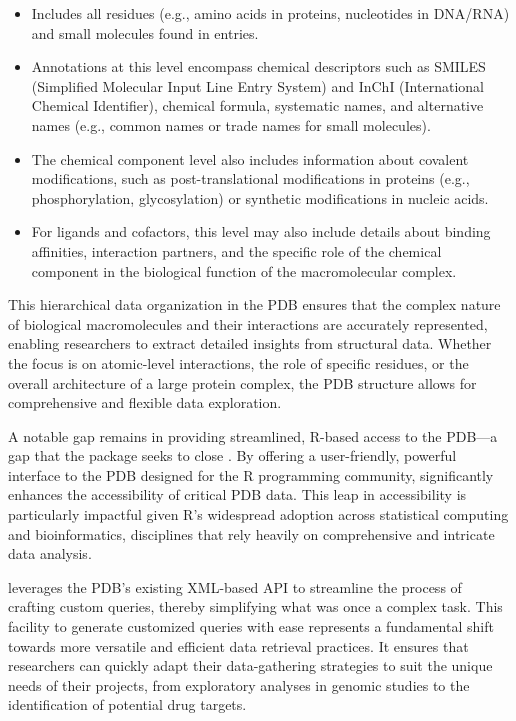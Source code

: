 \begin{itemize}
\tightlist
\item
  Includes all residues (e.g., amino acids in proteins, nucleotides in DNA/RNA) and small molecules found in entries.
\item
  Annotations at this level encompass chemical descriptors such as SMILES (Simplified Molecular Input Line Entry System) and InChI (International Chemical Identifier), chemical formula, systematic names, and alternative names (e.g., common names or trade names for small molecules).
\item
  The chemical component level also includes information about covalent modifications, such as post-translational modifications in proteins (e.g., phosphorylation, glycosylation) or synthetic modifications in nucleic acids.
\item
  For ligands and cofactors, this level may also include details about binding affinities, interaction partners, and the specific role of the chemical component in the biological function of the macromolecular complex.
\end{itemize}

This hierarchical data organization in the PDB ensures that the complex nature of biological macromolecules and their interactions are accurately represented, enabling researchers to extract detailed insights from structural data. Whether the focus is on atomic-level interactions, the role of specific residues, or the overall architecture of a large protein complex, the PDB structure allows for comprehensive and flexible data exploration.

A notable gap remains in providing streamlined, R-based access to the PDB---a gap that the  package seeks to close \citep{KorkmazYamasan2024}. By offering a user-friendly, powerful interface to the PDB designed for the R programming community,  significantly enhances the accessibility of critical PDB data. This leap in accessibility is particularly impactful given R's widespread adoption across statistical computing and bioinformatics, disciplines that rely heavily on comprehensive and intricate data analysis.

 leverages the PDB's existing XML-based API to streamline the process of crafting custom queries, thereby simplifying what was once a complex task. This facility to generate customized queries with ease represents a fundamental shift towards more versatile and efficient data retrieval practices. It ensures that researchers can quickly adapt their data-gathering strategies to suit the unique needs of their projects, from exploratory analyses in genomic studies to the identification of potential drug targets.

